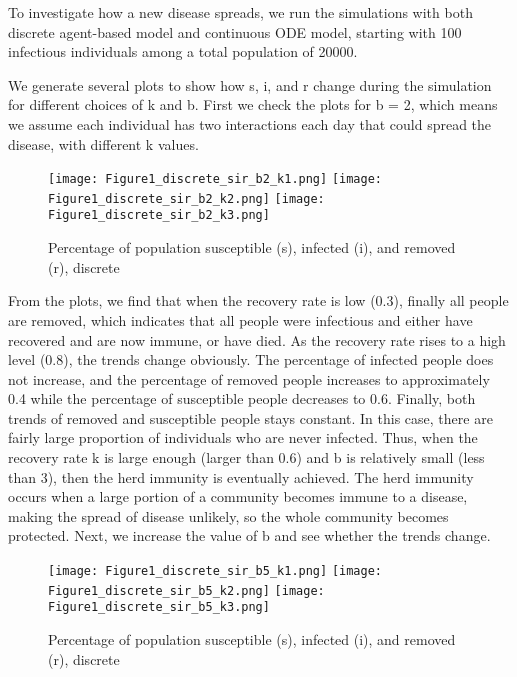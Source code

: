\documentclass{article}
\begin{document}
To investigate how a new disease spreads, we run the simulations with both discrete agent-based model and continuous ODE model, starting with 100 infectious individuals among a total population of 20000.

We generate several plots to show how s, i, and r change during the simulation for different choices of k and b. First we check the plots for b = 2, which means we assume each individual has two interactions each day that could spread the disease, with different k values.

\begin{figure}[htp]

\centering
\texttt{[image: Figure1\_discrete\_sir\_b2\_k1.png]}\hfill
\texttt{[image: Figure1\_discrete\_sir\_b2\_k2.png]}\hfill
\texttt{[image: Figure1\_discrete\_sir\_b2\_k3.png]}

\caption{Percentage of population susceptible (s), infected (i), and removed (r), discrete}
\label{fig:figure3}

\end{figure}



From the plots, we find that when the recovery rate is low (0.3), finally all people are removed, which indicates that all people were infectious and either have recovered and are now immune, or have died. As the recovery rate rises to a high level (0.8), the trends change obviously. The percentage of infected people does not increase, and the percentage of removed people increases to approximately 0.4 while the percentage of susceptible people decreases to 0.6. Finally, both trends of removed and susceptible people stays constant. In this case, there are fairly large proportion of individuals who are never infected. Thus, when the recovery rate k is large enough (larger than 0.6) and b is relatively small (less than 3), then the herd immunity is eventually achieved. The herd immunity occurs when a large portion of a community becomes immune to a disease, making the spread of disease unlikely, so the whole community becomes protected. Next, we increase the value of b and see whether the trends change.


\begin{figure}[htp]

\centering
\texttt{[image: Figure1\_discrete\_sir\_b5\_k1.png]}\hfill
\texttt{[image: Figure1\_discrete\_sir\_b5\_k2.png]}\hfill
\texttt{[image: Figure1\_discrete\_sir\_b5\_k3.png]}

\caption{Percentage of population susceptible (s), infected (i), and removed (r), discrete}
\label{fig:figure3}

\end{figure}
\end{document}

